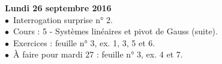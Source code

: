 \documentclass[12pt,a4paper]{article}
\begin{document}
%  
%  
%  
%  
%   
%  

\noindent\textbf{Lundi 26 septembre 2016 }\\
$\bullet$\ Interrogation surprise n° 2.\\
$\bullet$\ Cours : 5 - Systèmes linéaires et pivot de Gauss (suite).\\
$\bullet$\ Exercices : feuille n° 3, ex. 1, 3, 5 et 6.\\
$\bullet$\ À faire pour mardi 27 : feuille n° 3, ex. 4 et 7.\vspace{.4cm}\\
\end{document}
